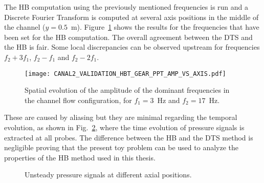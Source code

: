 The HB computation using the previously mentioned frequencies is
run and a Discrete Fourier Transform is computed at several axis positions
in the middle of the channel ($y=0.5$~m). Figure~\ref{fig:canal2_validation_hbt_gear_amp_vs_axis}
shows the results for the frequencies that have been set for the HB computation.
The overall agreement between the DTS and the HB is fair.  
Some local discrepancies can be
observed upstream for frequencies $f_2 + 3f_1$, $f_2 - f_1$ and $f_2 -
2f_1$. 
\begin{figure}[htb]
  \centering
  \texttt{[image: CANAL2\_VALIDATION\_HBT\_GEAR\_PPT\_AMP\_VS\_AXIS.pdf]}
  \caption{Spatial evolution of the amplitude of the dominant
    frequencies in the channel flow configuration, for $f_1 = 3$~Hz and $f_2 = 17$~Hz.}
  \label{fig:canal2_validation_hbt_gear_amp_vs_axis}
\end{figure}
These are caused by aliasing
but they are minimal regarding the temporal evolution, as
shown in Fig.~\ref{fig:canal2_validation_hbt_gear_time_ev}, where the
time evolution of pressure signals is extracted at all probes.  The
difference between the HB and the DTS method is negligible proving
that the present toy problem can be used to analyze the properties of 
the HB method used in this thesis.
\begin{figure}[htb]
  \centering 
   \quad{}
  \caption{Unsteady pressure signals at different axial positions.}
  \label{fig:canal2_validation_hbt_gear_time_ev}
\end{figure}

\FloatBarrier